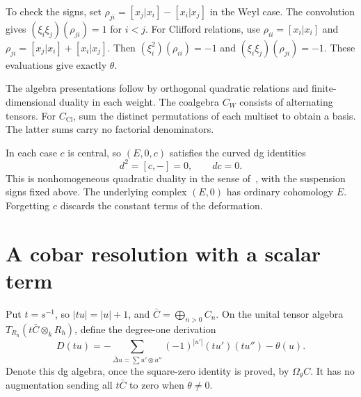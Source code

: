 To check the signs, set
$\rho_{ji}=[x_j|x_i]-[x_i|x_j]$ in the Weyl case.
The convolution gives $(\xi_i\xi_j)(\rho_{ji})=1$ for $i<j$.
For Clifford relations, use $\rho_{ii}=[x_i|x_i]$ and
$\rho_{ji}=[x_j|x_i]+[x_i|x_j]$.
Then $(\xi_i^2)(\rho_{ii})=-1$ and $(\xi_i\xi_j)(\rho_{ji})=-1$.
These evaluations give exactly $\theta$.

The algebra presentations follow by orthogonal quadratic relations and finite-dimensional duality in each weight.
The coalgebra $C_W$ consists of alternating tensors.
For $C_{\mathrm{Cl}}$, sum the distinct permutations of each multiset to obtain a basis.
The latter sums carry no factorial denominators.

In each case $c$ is central, so $(E,0,c)$ satisfies the curved dg identities
\[
 d^2=[c,-]=0,\qquad dc=0.
\]
This is nonhomogeneous quadratic duality in the sense of~\cite[\S\S2.1--2.2]{PositselskiCurvature2014}, with the suspension signs fixed above.
The underlying complex $(E,0)$ has ordinary cohomology $E$.
Forgetting $c$ discards the constant terms of the deformation.

\section{A cobar resolution with a scalar term}
Put $t=s^{-1}$, so $|tu|=|u|+1$, and $\bar C=\bigoplus_{n>0}C_n$.
On the unital tensor algebra $T_{R_\hbar}(t\bar C\otimes_k R_\hbar)$, define the degree-one derivation
\begin{equation}\label{eq:cbc:weyl:curved-cobar}
 D(tu)=-\sum_{\bar\Delta u=\sum u'\otimes u''}
                  (-1)^{|u'|}(tu')(tu'')-\theta(u).
\end{equation}
Denote this dg algebra, once the square-zero identity is proved, by $\Omega_\theta C$.
It has no augmentation sending all $t\bar C$ to zero when $\theta\ne0$.


